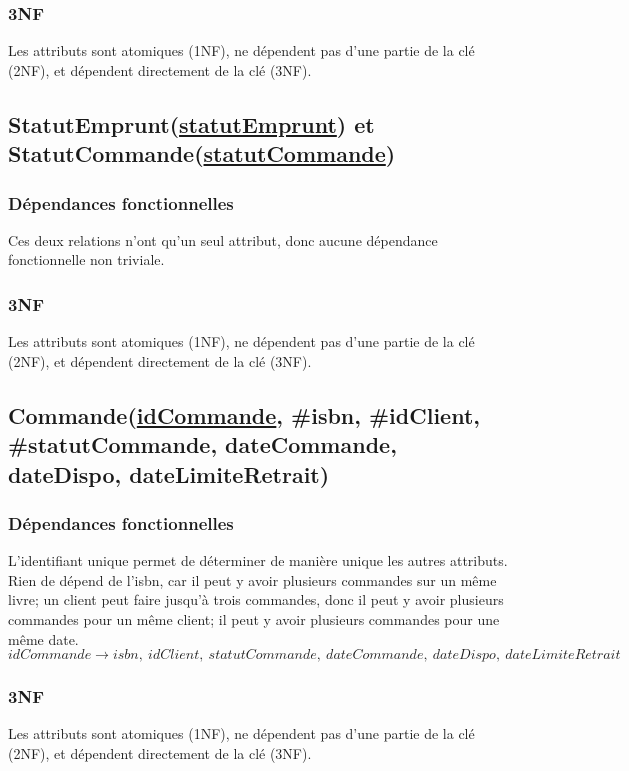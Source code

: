 \documentclass{article}
\begin{document}
\subsubsection{3NF}
Les attributs sont atomiques (1NF), ne dépendent pas d'une partie de la clé
(2NF), et dépendent directement de la clé (3NF).


\subsection{StatutEmprunt(\underline{statutEmprunt}) et
  StatutCommande(\underline{statutCommande})}
\subsubsection{Dépendances fonctionnelles}
Ces deux relations n'ont qu'un seul attribut, donc aucune dépendance
fonctionnelle non triviale.

\subsubsection{3NF}
Les attributs sont atomiques (1NF), ne dépendent pas d'une partie de la clé
(2NF), et dépendent directement de la clé (3NF).


\subsection{Commande(\underline{idCommande}, \#isbn, \#idClient,
  \#statutCommande, dateCommande, dateDispo, dateLimiteRetrait)}
\subsubsection{Dépendances fonctionnelles}
L'identifiant unique permet de déterminer de manière unique les autres
attributs. Rien de dépend de l'isbn, car il peut y avoir plusieurs commandes
sur un même livre; un client peut faire jusqu'à trois commandes, donc il peut y
avoir plusieurs commandes pour un même client; il peut y avoir plusieurs
commandes pour une même date.
$$idCommande \rightarrow isbn, \ idClient, \ statutCommande, \ dateCommande, \
dateDispo, \ dateLimiteRetrait$$

\subsubsection{3NF}
Les attributs sont atomiques (1NF), ne dépendent pas d'une partie de la clé
(2NF), et dépendent directement de la clé (3NF).
\end{document}
